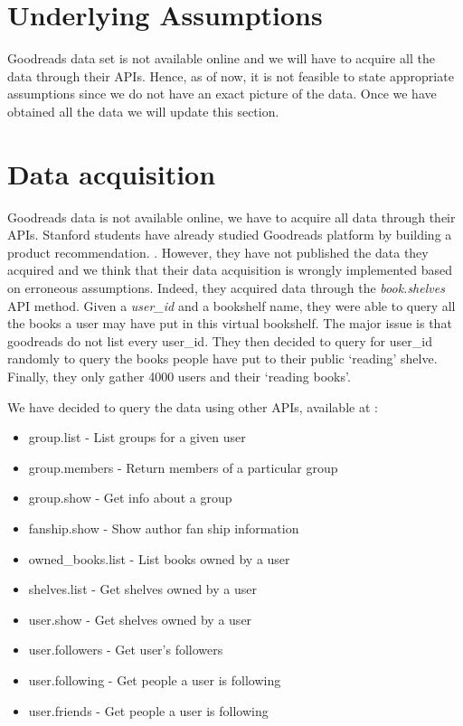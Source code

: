 \documentclass[12pt]{article}
\begin{document}
\section{Underlying Assumptions}

Goodreads data set is not available online and  we will have to acquire all the data through their APIs. Hence, as of now, it is not feasible to state appropriate assumptions since we do not have an exact picture of the data. Once we have obtained all the data we will update this section.

\section{Data acquisition}

Goodreads data is not available online, we have to acquire all data through their APIs. Stanford students have already studied Goodreads platform by building a product recommendation. \cite{stanford:goodreads}. However, they have not published the data they acquired and we think that their data acquisition is wrongly implemented based on erroneous assumptions. Indeed, they acquired data through the \textit{book.shelves} API method. Given a \textit{user\_id} and a bookshelf name, they were able to query all the books a user may have put in this virtual bookshelf. The major issue is that goodreads do not list every user\_id. They then decided to query for user\_id randomly to query the books people have put to their public `reading' shelve. Finally, they only gather 4000 users and their `reading books'.

We have decided to query the data using other APIs, available at \cite{goodreads:api}:
\begin{itemize}
\item group.list - List groups for a given user
\item group.members - Return members of a particular group
\item group.show - Get info about a group
\item fanship.show - Show author fan ship information
\item owned\_books.list - List books owned by a user
\item shelves.list - Get shelves owned by a user
\item user.show - Get shelves owned by a user
\item user.followers - Get user's followers
\item user.following - Get people a user is following
\item user.friends - Get people a user is following
\end{itemize}
\end{document}
